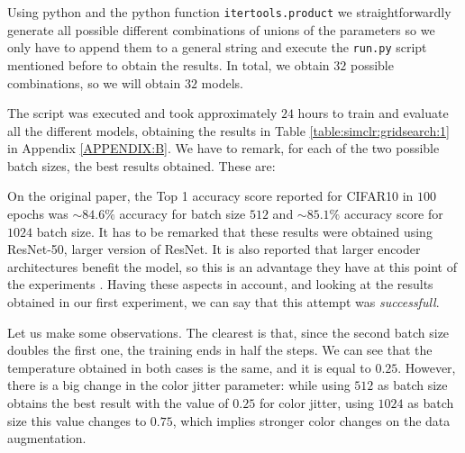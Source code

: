 Using python and the python function \lstinline{itertools.product} we straightforwardly generate all possible different combinations of unions of the parameters so we only have to append them to a general string and execute the \lstinline{run.py} script mentioned before to obtain the results. In total, we obtain $32$ possible combinations, so we will obtain $32$ models. 

The script was executed and took approximately $24$ hours to train and evaluate all the different models, obtaining the results in Table \ref{table:simclr:gridsearch:1} in Appendix \ref{APPENDIX:B}. We have to remark, for each of the two possible batch sizes, the best results obtained. These are:

\begin{table}[H]
    \label{table:best:first:simclr}
\centering
{}
\caption{Best results for the grid search experiment with SimCLR.}
\end{table}

\begin{remark}
On the original paper, the Top 1 accuracy score reported for CIFAR10 in $100$ epochs was $\sim 84.6\%$ accuracy for batch size $512$ and $\sim 85.1 \%$ accuracy score for $1024$ batch size. It has to be remarked that these results were obtained using ResNet-50,  larger version of ResNet. It is also reported that larger encoder architectures benefit the model, so this is an advantage they have at this point of the experiments . Having these aspects in account, and looking at the results obtained in our first experiment, we can say that this attempt was \emph{successfull}.
\end{remark}

Let us make some observations. The clearest is that, since the second batch size doubles the first one, the training ends in half the steps. We can see that the temperature obtained in both cases is the same, and it is equal to $0.25$. However, there is a big change in the color jitter parameter: while using $512$ as batch size obtains the best result with the value of $0.25$ for color jitter, using $1024$ as batch size this value changes to $0.75$, which implies stronger color changes on the data augmentation. 

